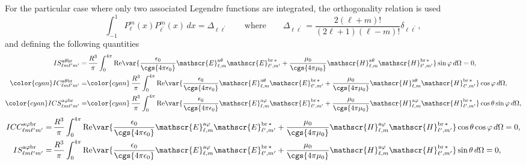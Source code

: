 For the particular case where only two associated Legendre functions are integrated, the orthogonality relation is used \cite{Abramowitz}
%
\begin{equation}
\int_{-1}^{1} P_{\ell}^{m}(x) P_{\ell^{\prime}}^{m}(x) \, dx = \Delta_{\ell \ell^{\prime}} \qquad \text{where} \qquad \Delta_{\ell \ell^{\prime}}= \frac{2(\ell+m)!}{(2\ell+1)(\ell-m)!} \delta_{\ell \ell^{\prime}},
\end{equation}
%
and defining the following quantities
%
\begin{align}
IS_{\ell m \ell^{\prime} m^{\prime}}^{\rm a \theta b r} 
=& \, \frac{R^3}{\pi} \int_{0}^{4\pi} {\rm Re}\var{\frac{\epsilon_0}{\cgs{4\pi\epsilon_0}}\mathscr{E}_{\ell, m}^{\text{a}\theta}\mathscr{E}_{\ell^{\prime}, m^{\prime}}^{\text{br}\,*} + \frac{\mu_0}{\cgs{4\pi\mu_0}}\mathscr{H}_{\ell, m}^{\text{a}\theta}\mathscr{H}_{\ell^{\prime}, m^{\prime}}^{\text{br}\,*} } \sin\varphi \, d\Omega = 0 ,
\\
%
%
%
\color{cyan}IC_{\ell m \ell^{\prime} m^{\prime}}^{\rm a \theta b r} 
=&\color{cyan} \, \frac{R^3}{\pi} \int_{0}^{4\pi} {\rm Re}\var{\frac{\epsilon_0}{\cgs{4\pi\epsilon_0}}\mathscr{E}_{\ell, m}^{\text{a}\theta}\mathscr{E}_{\ell^{\prime}, m^{\prime}}^{\text{br}\,*} + \frac{\mu_0}{\cgs{4\pi\mu_0}}\mathscr{H}_{\ell, m}^{\text{a}\theta}\mathscr{H}_{\ell^{\prime}, m^{\prime}}^{\text{br}\,*} } \cos\varphi \, d\Omega,\\
%
%
% 
\color{cyan}ICS_{\ell m \ell^{\prime} m^{\prime}}^{\rm a \varphi b r}
=& \color{cyan}\, \frac{R^3}{\pi} \int_0^{4\pi} {\rm Re}\var{ \frac{\epsilon_0}{\cgs{4\pi\epsilon_0}} \mathscr{E}_{\ell, m}^{\text{a}\varphi}\mathscr{E}_{\ell^{\prime}, m^{\prime}}^{\text{br}\,*} + \frac{\mu_0}{\cgs{4\pi\mu_0}} \mathscr{H}_{\ell, m}^{\text{a}\varphi}\mathscr{H}_{\ell^{\prime}, m^{\prime}}^{\text{br}\,*}}\cos\theta\sin\varphi \, d\Omega,  
%
\end{align}
\vspace{-0.8cm}
\begin{align}
%
ICC_{\ell m \ell^{\prime} m^{\prime}}^{\rm a \varphi b r}
 =& \, \frac{R^3}{\pi} \int_0^{4\pi}{\rm Re}\var{\frac{\epsilon_0}{\cgs{4\pi\epsilon_0}}\mathscr{E}_{\ell, m}^{\text{a}\varphi}\mathscr{E}_{\ell^{\prime}, m^{\prime}}^{\text{br}\,*} + \frac{\mu_0}{\cgs{4\pi\mu_0}}\mathscr{H}_{\ell, m}^{\text{a}\varphi}\mathscr{H}_{\ell^{\prime}, m^{\prime}}^{\text{br}\,*}}\cos\theta\cos\varphi \, d\Omega = 0 , \\
%
%
%
IS_{\ell m \ell^{\prime} m^{\prime}}^{\rm a \varphi b r}
 =& \, \frac{R^3}{\pi} \int_0^{4\pi}{\rm Re}\var{\frac{\epsilon_0}{\cgs{4\pi\epsilon_0}}\mathscr{E}_{\ell, m}^{\text{a}\varphi}\mathscr{E}_{\ell^{\prime}, m^{\prime}}^{\text{br}\,*} + \frac{\mu_0}{\cgs{4\pi\mu_0}}\mathscr{H}_{\ell, m}^{\text{a}\varphi}\mathscr{H}_{\ell^{\prime}, m^{\prime}}^{\text{br}\,*}}\sin\theta \, d\Omega = 0 ,
\end{align}
